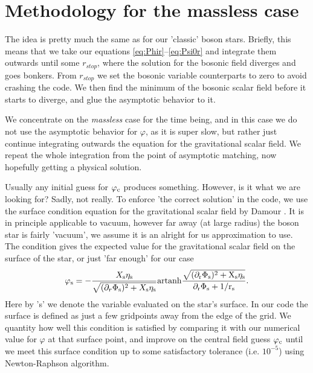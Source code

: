 \documentclass[12pt]{article}
\numberwithin{equation}{section}
\newcounter{count}
\begin{document}
\section{Methodology for the massless case}
The idea is pretty much the same as for our 'classic' boson stars. Briefly, this means that we take our equations \eqref{eq:Phir}--\eqref{eq:Psi0r} and integrate them outwards until some $r_{stop}$, where the solution for the bosonic field diverges and goes bonkers. From $r_{stop}$ we set the bosonic variable counterparts to zero to avoid crashing the code. We then find the minimum of the bosonic scalar field before it starts to diverge, and glue the asymptotic behavior to it. 

We concentrate on the \textit{massless} case for the time being, and in this case we do not use the asymptotic behavior for $\varphi$, as it is super slow, but rather just continue integrating outwards the equation for the gravitational scalar field. We repeat the whole integration from the point of asymptotic matching, now hopefully getting a physical solution. 

Usually any initial guess for $\varphi_{\rm{c}}$ produces something. However, is it what we are looking for? Sadly, not really. To enforce 'the correct solution' in the code, we use the surface condition equation for the gravitational scalar field by Damour \cite{Damour:1993hw, Gerosa:2016fri}. It is in principle applicable to vacuum, however far away (at large radius) the boson star is fairly 'vacuum', we assume it is an alright for us approximation to use. The condition gives the expected value for the gravitational scalar field on the surface of the star, or just 'far enough' for our case
\begin{equation} \label{eq:Damour_condition}
    \varphi_{\rm{s}} = - \frac{X_{\rm{s}} \eta_{\rm{s}}}{\sqrt{(\partial_r \Phi_{\rm{s}})^2 + X_{\rm{s}} \eta_{\rm{s}}}} \rm{artanh} \frac{\sqrt{(\partial_r \Phi_{\rm{s}})^2 + X_{\rm{s}} \eta_{\rm{s}}}}{\partial_r \Phi_{\rm{s}} + 1/r_{\rm{s}}}.
\end{equation}
Here by 's' we denote the variable evaluated on the star's surface. In our code the surface is defined as just a few gridpoints away from the edge of the grid. We quantity how well this condition is satisfied by comparing it with our numerical value for $\varphi$ at that surface point, and improve on the central field guess $\varphi_{\rm{c}}$ until we meet this surface condition up to some satisfactory tolerance (i.e. $10^{-5}$) using Newton-Raphson algorithm.
\end{document}
